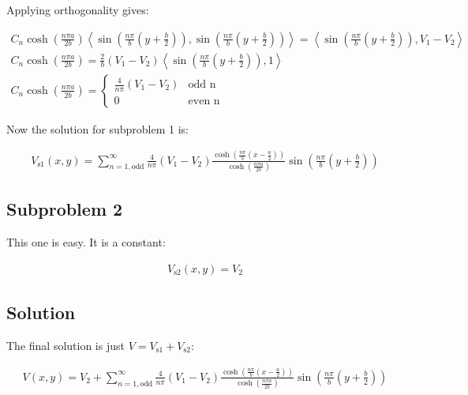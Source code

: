 \documentclass[12pt, a4paper]{article}
\begin{document}
Applying orthogonality gives:

\begin{gather}
C_n \cosh\left(\frac{n\pi a}{2b}\right) \left\langle \sin\left(\frac{n\pi}{b}\left(y+\frac{b}{2}\right)\right), \sin\left(\frac{n\pi}{b}\left(y+\frac{b}{2}\right)\right) \right\rangle = \left\langle \sin\left(\frac{n\pi}{b}\left(y+\frac{b}{2}\right)\right), V_1-V_2 \right\rangle \\
C_n \cosh\left(\frac{n\pi a}{2b}\right) = \frac{2}{b} (V_1-V_2) \left\langle \sin\left(\frac{n\pi}{b}\left(y+\frac{b}{2}\right)\right), 1 \right\rangle \\
C_n \cosh\left(\frac{n\pi a}{2b}\right) = \begin{cases} \frac{4}{n\pi} (V_1-V_2) & \text{odd n} \\ 0 & \text{even n} \end{cases}
\end{gather}

Now the solution for subproblem 1 is:

\begin{gather}
V_{\text{s1}}(x,y) = \sum_{n=1,\text{odd}}^\infty \frac{4}{n\pi} (V_1-V_2) \frac{\cosh\left(\frac{n\pi}{b}\left(x-\frac{a}{2}\right)\right)}{\cosh\left(\frac{n\pi a}{2b}\right)} \sin\left(\frac{n\pi}{b}\left(y+\frac{b}{2}\right)\right)
\end{gather}

\subsection*{Subproblem 2}

This one is easy. It is a constant:

\begin{gather}
V_{\text{s2}}(x,y) = V_2
\end{gather}

\subsection*{Solution}

The final solution is just $V=V_{\text{s1}}+V_{\text{s2}}$:

\begin{gather}
V(x,y) = V_2 + \sum_{n=1,\text{odd}}^\infty \frac{4}{n\pi} (V_1-V_2) \frac{\cosh\left(\frac{n\pi}{b}\left(x-\frac{a}{2}\right)\right)}{\cosh\left(\frac{n\pi a}{2b}\right)} \sin\left(\frac{n\pi}{b}\left(y+\frac{b}{2}\right)\right)
\end{gather}
\end{document}
